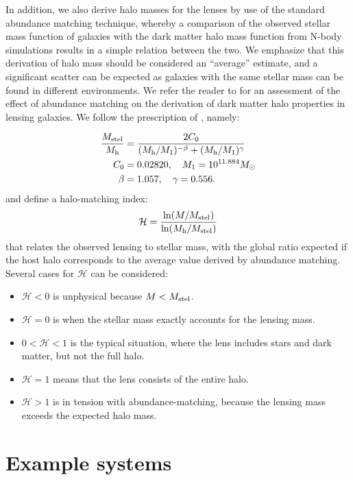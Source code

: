 \documentclass[fleqn,usenatbib]{mnras}
\newcommand{\Mstel}{M_{\rm stel}}
\newcommand{\Mhalo}{M_{\rm h}}
\newcommand{\haloindex}{\mathcal{H}}
\begin{document}
In addition, we also derive halo masses for the lenses by use of the
standard abundance matching technique, whereby a comparison of the
observed stellar mass function of galaxies with the dark matter halo
mass function from N-body simulations results in a simple relation
between the two. We emphasize that this derivation of halo mass should
be considered an ``average'' estimate, and a significant scatter can
be expected as galaxies with the same stellar mass can be found in
different environments. We refer the reader to \cite{2012MNRAS.424..104L}
for an assessment of the effect of abundance matching on the
derivation of dark matter halo properties in lensing galaxies. We
follow the prescription of \citet{2010ApJ...710..903M}, namely:

\begin{equation}
\begin{aligned}
\frac{\Mstel}{\Mhalo} &= \frac{2C_0}{(\Mhalo/M_1)^{-\beta} +
                                     (\Mhalo/M_1)^\gamma} \\
C_0 &= 0.02820, \quad M_1 = 10^{11.884} M_\odot \\
\beta &= 1.057, \quad \gamma = 0.556.
\end{aligned}
\end{equation}
and define a halo-matching index:
\begin{equation}
\haloindex = \frac{\ln(M/\Mstel)}{\ln(\Mhalo/\Mstel)}
\end{equation}
that relates the observed lensing to stellar mass, with the
global ratio expected if the host halo corresponds to the
average value derived by abundance matching. Several cases
for $\haloindex$ can be considered:
\begin{itemize}
\item $\haloindex < 0$ is unphysical because $M<\Mstel$.
\item $\haloindex = 0$ is when the stellar mass exactly accounts for the
  lensing mass.
\item $0 < \haloindex < 1$ is the typical situation, where the lens
  includes stars and dark matter, but not the full halo.
\item $\haloindex = 1$ means that the lens consists of the entire halo.
\item $\haloindex > 1$ is in tension with abundance-matching, because the
  lensing mass exceeds the expected halo mass.
\end{itemize}

\section{Example systems}\label{sec:examples}
\end{document}

